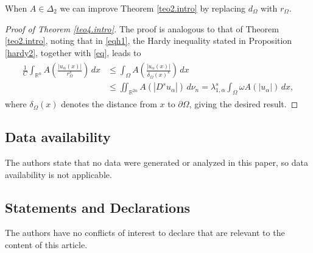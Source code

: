 \documentclass[12pt,reqno]{amsart}
\theoremstyle{definition}
\theoremstyle{remark}
\numberwithin{equation}{section}
\begin{document}
 

When $A\in \Delta_2$ we can improve Theorem \ref{teo2.intro} by replacing $d_\Omega$ with $r_\Omega$.

 
\begin{proof}[Proof of Theorem \ref{teo4.intro}]
The proof is analogous to that of Theorem \ref{teo2.intro}, noting that in \eqref{eqh1}, the Hardy inequality stated in Proposition \ref{hardy2}, together with \eqref{eq}, leads to
\begin{align*}  
\begin{split}
\frac{1}{C}\int_{\mathbb{R}^n} A\left(\frac{ |u_\alpha(x)|}{r_\Omega^s}\right)\,dx &\leq   \int_\Omega A\left(\frac{|u_\alpha(x)|}{\delta_\Omega(x)^s}\right)\,dx\\
&\leq \iint_{\mathbb{R}^{2n}} A(|D^s u_\alpha|) \,d\nu_n = \lambda_{1,\alpha}^s \int_\Omega \omega A(|u_\alpha|)\,dx,
\end{split}
\end{align*}
where $\delta_\Omega(x)$ denotes the distance from $x$ to $\partial \Omega$,  giving the desired result.
\end{proof}

\subsection*{Data availability}
The authors state that no data were generated or analyzed in this paper, so data availability is not applicable.

\subsection*{Statements and Declarations}
The authors have no conflicts of interest to declare that are relevant to the content of this article.


 
\end{document}
